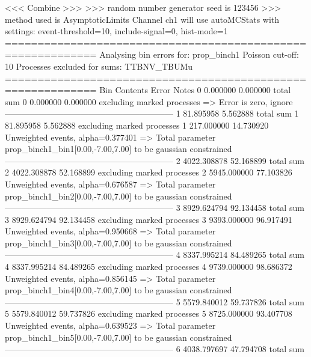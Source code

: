  <<< Combine >>> 
>>> random number generator seed is 123456
>>> method used is AsymptoticLimits
Channel ch1 will use autoMCStats with settings: event-threshold=10, include-signal=0, hist-mode=1
============================================================
Analysing bin errors for: prop_binch1
Poisson cut-off: 10
Processes excluded for sums: TTBNV_TBUMu
============================================================
Bin        Contents        Error           Notes                         
0          0.000000        0.000000        total sum                     
0          0.000000        0.000000        excluding marked processes    
  => Error is zero, ignore      
------------------------------------------------------------
1          81.895958       5.562888        total sum                     
1          81.895958       5.562888        excluding marked processes    
1          217.000000      14.730920       Unweighted events, alpha=0.377401
  => Total parameter prop_binch1_bin1[0.00,-7.00,7.00] to be gaussian constrained
------------------------------------------------------------
2          4022.308878     52.168899       total sum                     
2          4022.308878     52.168899       excluding marked processes    
2          5945.000000     77.103826       Unweighted events, alpha=0.676587
  => Total parameter prop_binch1_bin2[0.00,-7.00,7.00] to be gaussian constrained
------------------------------------------------------------
3          8929.624794     92.134458       total sum                     
3          8929.624794     92.134458       excluding marked processes    
3          9393.000000     96.917491       Unweighted events, alpha=0.950668
  => Total parameter prop_binch1_bin3[0.00,-7.00,7.00] to be gaussian constrained
------------------------------------------------------------
4          8337.995214     84.489265       total sum                     
4          8337.995214     84.489265       excluding marked processes    
4          9739.000000     98.686372       Unweighted events, alpha=0.856145
  => Total parameter prop_binch1_bin4[0.00,-7.00,7.00] to be gaussian constrained
------------------------------------------------------------
5          5579.840012     59.737826       total sum                     
5          5579.840012     59.737826       excluding marked processes    
5          8725.000000     93.407708       Unweighted events, alpha=0.639523
  => Total parameter prop_binch1_bin5[0.00,-7.00,7.00] to be gaussian constrained
------------------------------------------------------------
6          4038.797697     47.794708       total sum                     
